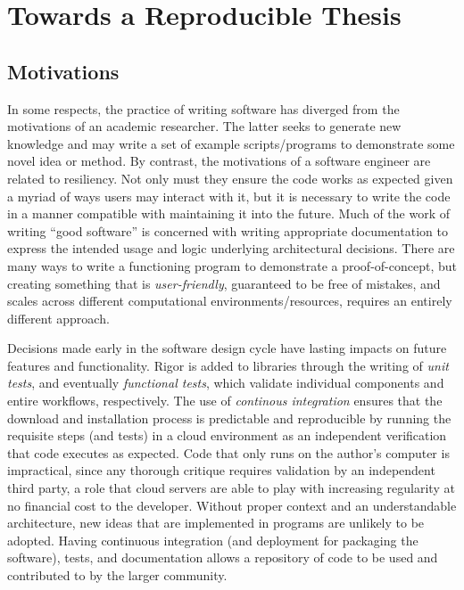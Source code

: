 \section{Towards a Reproducible Thesis}\label{sec:reproducibility}

\subsection{Motivations}\label{sec:motivations}
In some respects, the practice of writing software has diverged from the motivations of an academic researcher.
The latter seeks to generate new knowledge and may write a set of example scripts/programs to demonstrate some novel idea or method.
By contrast, the motivations of a software engineer are related to resiliency.
Not only must they ensure the code works as expected given a myriad of ways users may interact with it, but it is necessary to write the code in a manner compatible with maintaining it into the future.
Much of the work of writing ``good software'' is concerned with writing appropriate documentation to express the intended usage and logic underlying architectural decisions.
There are many ways to write a functioning program to demonstrate a proof-of-concept, but creating something that is \emph{user-friendly}, guaranteed to be free of mistakes, and scales across different computational environments/resources, requires an entirely different approach.

Decisions made early in the software design cycle have lasting impacts on future features and functionality.
Rigor is added to libraries through the writing of \emph{unit tests}, and eventually \emph{functional tests}, which validate individual components and entire workflows, respectively.
The use of \emph{continous integration} ensures that the download and installation process is predictable and reproducible by running the requisite steps (and tests) in a cloud environment as an independent verification that code executes as expected.
Code that only runs on the author's computer is impractical, since any thorough critique requires validation by an independent third party, a role that cloud servers are able to play with increasing regularity at no financial cost to the developer.
Without proper context and an understandable architecture, new ideas that are implemented in programs are unlikely to be adopted.
Having continuous integration (and deployment for packaging the software), tests, and documentation allows a repository of code to be used and contributed to by the larger community.

